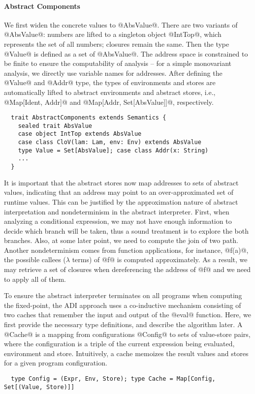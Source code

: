 \paragraph{Abstract Components}

We first widen the concrete values to @AbsValue@. There are two variants of
@AbsValue@: numbers are lifted to a singleton object @IntTop@, which represents
the set of all numbers; closures remain the same. Then the type @Value@ is
defined as a set of @AbsValue@.  The address space is constrained to be finite
to ensure the computability of analysis -- for a simple monovariant analysis,
we directly use variable names for addresses. After defining the @Value@ and
@Addr@ type, the types of environments and stores are automatically lifted to
abstract environments and abstract stores, i.e., @Map[Ident, Addr]@ and
@Map[Addr, Set[AbsValue]]@, respectively.  
\begin{lstlisting}
  trait AbstractComponents extends Semantics {
    sealed trait AbsValue
    case object IntTop extends AbsValue
    case class CloV(lam: Lam, env: Env) extends AbsValue
    type Value = Set[AbsValue]; case class Addr(x: String)
    ...
  }
\end{lstlisting}

It is important that the abstract stores now map addresses to sets of abstract
values, indicating that an address may point to an over-approximated set of
runtime values.  This can be justified by the approximation nature of abstract
interpretation and nondeterminism in the abstract interpreter.  First, when
analyzing a conditional expression, we may not have enough information to
decide which branch will be taken, thus a sound treatment is to explore the both
branches. Also, at some later point, we need to compute the join of two path.
Another nondeterminism comes from function applications, for instance, @f(a)@,
the possible callees ($\lambda$ terms) of @f@ is computed approximately.  As a
result, we may retrieve a set of closures when dereferencing the address of @f@
and we need to apply all of them.

To ensure the abstract interpreter terminates on all programs when computing
the fixed-point, the ADI approach uses a co-inductive mechanism consisting of
two caches that remember the input and output of the @eval@ function.
Here, we first provide the necessary type definitions, and describe
the algorithm later. A @Cache@ is a mapping from configurations @Config@ to
sets of value-store pairs, where the configuration is a triple of the current
expression being evaluated, environment and store. Intuitively, a cache memoizes
the result values and stores for a given program configuration.
\begin{lstlisting}
  type Config = (Expr, Env, Store); type Cache = Map[Config, Set[(Value, Store)]]
\end{lstlisting}

